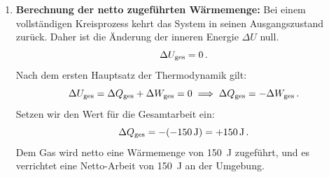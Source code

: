\documentclass[ngerman]{scrreprt}
\newenvironment{loesungbox}[1]
  {\needspace{5\baselineskip}\begin{loesungboxstyle}[frametitle={#1}]}
  {\end{loesungboxstyle}}
\begin{document}
\begin{loesungbox}{Lösung zu \Cref{aufg:volumenarbeit}}
\begin{enumerate}
    \textbf{Gesamtarbeit des Zyklus:}
    Die Gesamtarbeit ist die Summe der Arbeiten der Teilschritte:
    \begin{equation}
        \Delta W_{\text{ges}} = W_{AB} + W_{BC} + W_{CD} + W_{DA} = -300 + 0 + 150 + 0 = \SI{-150}{\joule} \mDot
    \end{equation}
    
    \item \textbf{Berechnung der netto zugeführten Wärmemenge:}
    Bei einem vollständigen Kreisprozess kehrt das System in seinen Ausgangszustand zurück. Daher ist die Änderung der inneren Energie $\Delta U$ null.
    \begin{equation}
        \Delta U_{\text{ges}} = 0 \,.
    \end{equation}
    Nach dem ersten Hauptsatz der Thermodynamik gilt:
    \begin{equation}
        \Delta U_{\text{ges}} = \Delta Q_{\text{ges}} + \Delta W_{\text{ges}} = 0 \implies \Delta Q_{\text{ges}} = -\Delta W_{\text{ges}} \,.
    \end{equation}
    Setzen wir den Wert für die Gesamtarbeit ein:
    \begin{equation}
        \Delta Q_{\text{ges}} = -(\SI{-150}{\joule}) = +\SI{150}{\joule} \,.
    \end{equation}
    Dem Gas wird netto eine Wärmemenge von \SI{150}{\joule} zugeführt, und es verrichtet eine Netto-Arbeit von \SI{150}{\joule} an der Umgebung.
\end{enumerate}
\end{loesungbox}
\end{document}
